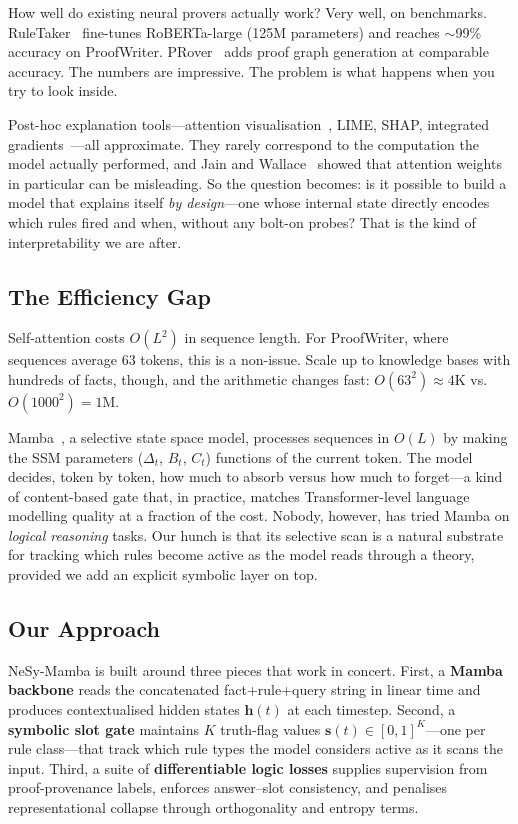 \documentclass[conference]{IEEEtran}
\DeclareRobustCommand{\model}{NeSy-Mamba}
\begin{document}
How well do existing neural provers actually work? Very well, on
benchmarks.  RuleTaker~\cite{clark2020ruletaker} fine-tunes
RoBERTa-large (125M parameters) and reaches $\sim$99\% accuracy on
ProofWriter. PRover~\cite{saha2020prover} adds proof graph generation
at comparable accuracy.  The numbers are impressive.  The problem is
what happens when you try to look inside.

Post-hoc explanation tools---attention
visualisation~\cite{jain2019attention}, LIME, SHAP, integrated
gradients~\cite{sundararajan2017ig}---all approximate. They rarely
correspond to the computation the model actually performed, and Jain
and Wallace~\cite{jain2019attention} showed that attention weights
in particular can be misleading. So the question becomes: is it
possible to build a model that explains itself \emph{by design}---one
whose internal state directly encodes which rules fired and when,
without any bolt-on probes? That is the kind of interpretability we
are after.

\subsection{The Efficiency Gap}

Self-attention costs $O(L^2)$ in sequence length. For ProofWriter,
where sequences average 63 tokens, this is a non-issue. Scale up to
knowledge bases with hundreds of facts, though, and the arithmetic
changes fast: $O(63^2) \approx 4$K vs.\ $O(1000^2) = 1$M.

Mamba~\cite{gu2023mamba}, a selective state space model, processes
sequences in $O(L)$ by making the SSM parameters ($\Delta_t$, $B_t$,
$C_t$) functions of the current token. The model decides, token by
token, how much to absorb versus how much to forget---a kind of
content-based gate that, in practice, matches Transformer-level
language modelling quality at a fraction of the cost. Nobody, however,
has tried Mamba on \emph{logical reasoning} tasks.  Our hunch is that
its selective scan is a natural substrate for tracking which rules
become active as the model reads through a theory, provided we add an
explicit symbolic layer on top.

\subsection{Our Approach}

\model{} is built around three pieces that work in concert.
First, a \textbf{Mamba backbone} reads the concatenated
fact+rule+query string in linear time and produces contextualised
hidden states $\mathbf{h}(t)$ at each timestep. Second, a
\textbf{symbolic slot gate} maintains $K$ truth-flag values
$\mathbf{s}(t) \in [0,1]^K$---one per rule class---that track
which rule types the model considers active as it scans the input.
Third, a suite of \textbf{differentiable logic losses} supplies
supervision from proof-provenance labels, enforces answer--slot
consistency, and penalises representational collapse through
orthogonality and entropy terms.
\end{document}
